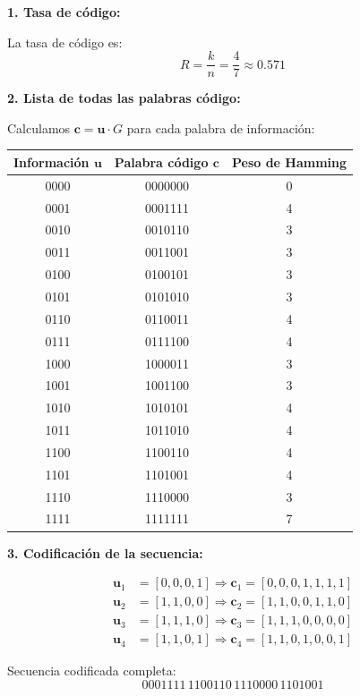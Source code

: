 \documentclass[10pt,a4paper]{article}
\begin{document}
\begin{solucion}
\textbf{1. Tasa de código:}

La tasa de código es:
\[
R = \frac{k}{n} = \frac{4}{7} \approx 0.571
\]

\textbf{2. Lista de todas las palabras código:}

Calculamos $\mathbf{c} = \mathbf{u} \cdot G$ para cada palabra de información:

\begin{center}
\begin{tabular}{|c|c|c|}
\hline
Información $\mathbf{u}$ & Palabra código $\mathbf{c}$ & Peso de Hamming \\
\hline
0000 & 0000000 & 0 \\
0001 & 0001111 & 4 \\
0010 & 0010110 & 3 \\
0011 & 0011001 & 3 \\
0100 & 0100101 & 3 \\
0101 & 0101010 & 3 \\
0110 & 0110011 & 4 \\
0111 & 0111100 & 4 \\
1000 & 1000011 & 3 \\
1001 & 1001100 & 3 \\
1010 & 1010101 & 4 \\
1011 & 1011010 & 4 \\
1100 & 1100110 & 4 \\
1101 & 1101001 & 4 \\
1110 & 1110000 & 3 \\
1111 & 1111111 & 7 \\
\hline
\end{tabular}
\end{center}

\textbf{3. Codificación de la secuencia:}

\begin{align*}
\mathbf{u}_1 &= [0,0,0,1] \Rightarrow \mathbf{c}_1 = [0,0,0,1,1,1,1] \\
\mathbf{u}_2 &= [1,1,0,0] \Rightarrow \mathbf{c}_2 = [1,1,0,0,1,1,0] \\
\mathbf{u}_3 &= [1,1,1,0] \Rightarrow \mathbf{c}_3 = [1,1,1,0,0,0,0] \\
\mathbf{u}_4 &= [1,1,0,1] \Rightarrow \mathbf{c}_4 = [1,1,0,1,0,0,1]
\end{align*}

Secuencia codificada completa:
\[
0001111 \, 1100110 \, 1110000 \, 1101001
\]


\end{solucion}
\end{document}
